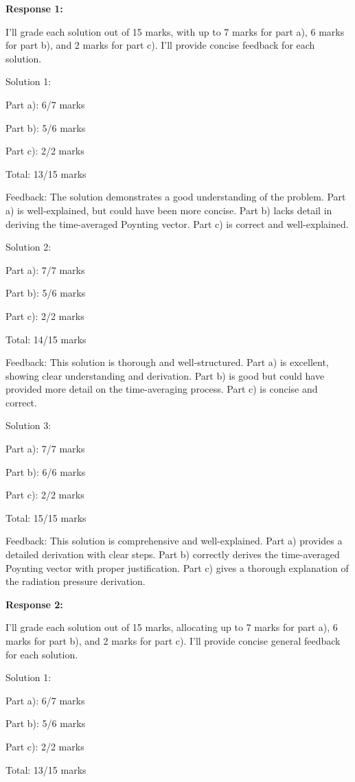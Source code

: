 \documentclass[a4paper,11pt]{article}
\begin{document}
\textbf{Response 1:}

I'll grade each solution out of 15 marks, with up to 7 marks for part a), 6 marks for part b), and 2 marks for part c). I'll provide concise feedback for each solution.

Solution 1:

Part a): 6/7 marks

Part b): 5/6 marks

Part c): 2/2 marks

Total: 13/15 marks

Feedback: The solution demonstrates a good understanding of the problem. Part a) is well-explained, but could have been more concise. Part b) lacks detail in deriving the time-averaged Poynting vector. Part c) is correct and well-explained.

Solution 2:

Part a): 7/7 marks

Part b): 5/6 marks

Part c): 2/2 marks

Total: 14/15 marks

Feedback: This solution is thorough and well-structured. Part a) is excellent, showing clear understanding and derivation. Part b) is good but could have provided more detail on the time-averaging process. Part c) is concise and correct.

Solution 3:

Part a): 7/7 marks

Part b): 6/6 marks

Part c): 2/2 marks

Total: 15/15 marks

Feedback: This solution is comprehensive and well-explained. Part a) provides a detailed derivation with clear steps. Part b) correctly derives the time-averaged Poynting vector with proper justification. Part c) gives a thorough explanation of the radiation pressure derivation.

\bigskip
\textbf{Response 2:}

I'll grade each solution out of 15 marks, allocating up to 7 marks for part a), 6 marks for part b), and 2 marks for part c). I'll provide concise general feedback for each solution.

Solution 1:

Part a): 6/7 marks

Part b): 5/6 marks

Part c): 2/2 marks

Total: 13/15 marks
\end{document}
